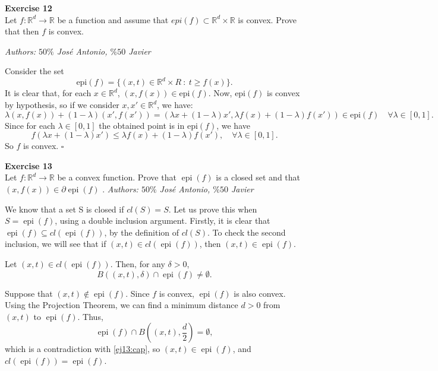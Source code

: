 \documentclass[11pt,table]{article}
\newcommand{\qed}{\hfill $\square$}
\newenvironment{problem}[2][Exercise]
{ \begin{mdframed}[backgroundcolor=gray!20] \textbf{#1 #2} \\}
	{\hspace{0.0cm}\newline\newline \emph{Authors: \(50\%\) José Antonio, \(\%50\) Javier}  \end{mdframed}}
\newcommand\R{\mathbb R}
\begin{document}
\begin{problem}{12}
Let \( f:\mathbb{R}^d \to \mathbb{R} \)  be a function and assume that \( epi(f) \subset \mathbb{R}^d \times \mathbb{R} \)  is convex. Prove that then \( f \)  is convex.

\end{problem}

Consider the set
\[
	\text{epi}(f) = \{(x,t)\in \R^d \times R \ : \ t \geq f(x)\}.
\]
It is clear that, for each \(x \in \R^d\), \((x,f(x))\in \text{epi}(f)\). Now, \(\text{epi}(f)\) is convex by hypothesis, so if we consider \(x,x'\in \R^d\), we have:
\[
	\lambda(x,f(x)) + (1-\lambda)(x',f(x')) = \left(\lambda x + (1-\lambda)x', \lambda f(x) + (1-\lambda)f(x')\right) \in \text{epi}(f)\quad \forall \lambda \in [0,1].
\]
Since for each \(\lambda \in [0,1]\) the obtained point is in \(\text{epi}(f)\), we have
\[
	f(\lambda x + (1-\lambda)x') \leq \lambda f(x) + (1-\lambda)f(x'), \quad \forall \lambda \in [0,1].
\]
So \(f\) is convex. \qed \\


\begin{problem}{13}
Let \( f : \mathbb{R}^d \to \mathbb{R} \) be a convex function. Prove that \( \operatorname{epi}(f) \) is a closed set and that \( (x, f(x)) \in \partial \operatorname{epi}(f) \)  .
\end{problem}

We know that a set S is closed if \(cl(S) = S\). Let us prove this when \(S = \operatorname{epi}(f)\), using a double inclusion argument. Firstly, it is clear that $\operatorname{epi}(f) \subseteq cl(\operatorname{epi}(f))$, by the definition of \(cl(S)\). To check the second inclusion, we will see that if \((x,t)\in cl(\operatorname{epi}(f))\), then \((x,t) \in \operatorname{epi}(f)\).

Let \((x,t)\in cl(\operatorname{epi}(f))\). Then, for any \(\delta > 0\),
\begin{equation}\label{ej13:cap}
	B((x,t),\delta) \cap 	\operatorname{epi}(f) \neq \emptyset.
\end{equation}

Suppose that \((x,t)\notin \operatorname{epi}(f)\). Since \(f\) is convex, \(\operatorname{epi}(f)\) is also convex. Using the Projection Theorem, we can find a minimum distance \(d > 0\) from \((x,t)\) to \(\operatorname{epi}(f)\). Thus,
\[
	\operatorname{epi}(f) \cap B((x,t), \frac{d}{2}) = \emptyset,
\]
which is a contradiction with \eqref{ej13:cap}, so \((x,t) \in \operatorname{epi}(f)\), and \(cl(\operatorname{epi}(f)) = \operatorname{epi}(f)\).
\end{document}
